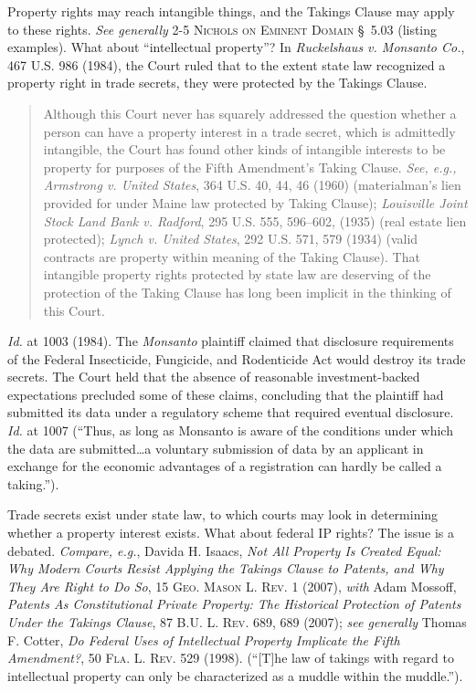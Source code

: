 Property rights may reach intangible things, and the Takings Clause may apply to
these rights. \textit{See generally} 2-5 \textsc{Nichols on Eminent Domain}
\S~5.03 (listing examples). What about ``intellectual property''? In
\textit{Ruckelshaus v. Monsanto Co.}, 467 U.S. 986 (1984), the Court ruled that
to the extent state law recognized a property right in trade secrets, they were
protected by the Takings Clause. 
\begin{quote}
Although this Court never has squarely addressed the question whether a person
can have a property interest in a trade secret, which is admittedly intangible,
the Court has found other kinds of intangible interests to be property for
purposes of the Fifth Amendment's Taking Clause. \textit{See, e.g., Armstrong v.
United States}, 364 U.S. 40, 44, 46 (1960) (materialman's lien provided for
under Maine law protected by Taking Clause); \textit{Louisville Joint Stock Land
Bank v. Radford}, 295 U.S. 555, 596--602, (1935) (real estate lien protected);
\textit{Lynch v. United States}, 292 U.S. 571, 579 (1934) (valid contracts are
property within meaning of the Taking Clause). That intangible property rights
protected by state law are deserving of the protection of the Taking Clause has
long been implicit in the thinking of this Court.
\end{quote}
\textit{Id.} at 1003 (1984). The \textit{Monsanto} plaintiff claimed that
disclosure requirements of the Federal Insecticide, Fungicide, and Rodenticide
Act would destroy its trade secrets. The Court held that the absence of
reasonable investment-backed expectations precluded some of these claims,
concluding that the plaintiff had submitted its data under a regulatory scheme
that required eventual disclosure. \textit{Id.} at 1007 (``Thus, as long as
Monsanto is aware of the conditions under which the data are submitted\ldots a
voluntary submission of data by an applicant in exchange for the economic
advantages of a registration can hardly be called a taking.'').

Trade secrets exist under state law, to which courts may look in determining
whether a property interest exists. What about federal IP rights? The issue is a
debated. \textit{Compare, e.g.}, Davida H. Isaacs, \textit{Not All Property Is
Created Equal: Why Modern Courts Resist Applying the Takings Clause to Patents,
and Why They Are Right to Do So}, 15 \textsc{Geo. Mason L. Rev.} 1 (2007),
\textit{with} Adam Mossoff, \textit{Patents As Constitutional Private Property:
The Historical Protection of Patents Under the Takings Clause}, 87 \textsc{B.U.
L. Rev}. 689, 689 (2007); \textit{see generally} Thomas F. Cotter, \textit{Do
Federal Uses of Intellectual Property Implicate the Fifth Amendment?}, 50
\textsc{Fla. L. Rev}. 529 (1998). (``[T]he law of takings with regard to
intellectual property can only be characterized as a muddle within the
muddle.'').


